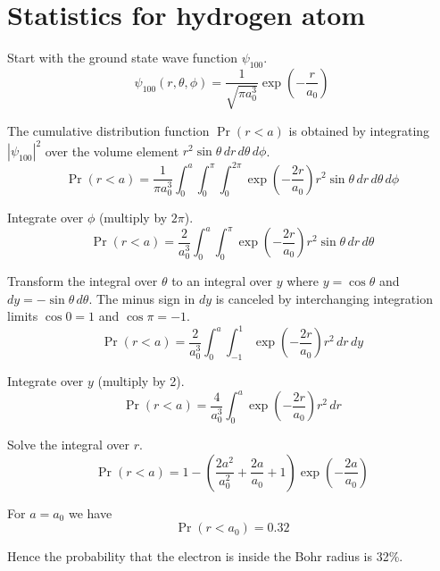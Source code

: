 

\section*{Statistics for hydrogen atom}

Start with the ground state wave function $\psi_{100}$.
\begin{equation*}
\psi_{100}(r,\theta,\phi)=\frac{1}{\sqrt{\pi a_0^3}}\exp\left(-\frac{r}{a_0}\right)
\end{equation*}

The cumulative distribution function $\Pr(r<a)$ is obtained by integrating
$|\psi_{100}|^2$ over the volume element $r^2\sin\theta\,dr\,d\theta\,d\phi$.
\begin{equation*}
\Pr(r<a)=\frac{1}{\pi a_0^3}
\int_0^a\int_0^\pi\int_0^{2\pi}\exp\left(-\frac{2r}{a_0}\right)
r^2\sin\theta\,dr\,d\theta\,d\phi
\end{equation*}

Integrate over $\phi$ (multiply by $2\pi$).
\begin{equation*}
\Pr(r<a)=\frac{2}{a_0^3}
\int_0^a\int_0^\pi\exp\left(-\frac{2r}{a_0}\right)r^2\sin\theta\,dr\,d\theta
\end{equation*}

Transform the integral over $\theta$ to an integral over $y$ where
$y=\cos\theta$ and $dy=-\sin\theta\,d\theta$.
The minus sign in $dy$ is canceled by interchanging integration limits
$\cos0=1$ and $\cos\pi=-1$.
\begin{equation*}
\Pr(r<a)=\frac{2}{a_0^3}
\int_0^a\int_{-1}^1\exp\left(-\frac{2r}{a_0}\right)r^2\,dr\,dy
\end{equation*}

Integrate over $y$ (multiply by 2).
\begin{equation*}
\Pr(r<a)=\frac{4}{a_0^3}
\int_0^a\exp\left(-\frac{2r}{a_0}\right)r^2\,dr
\end{equation*}

Solve the integral over $r$.
\begin{equation*}
\Pr(r<a)=1-\left(\frac{2a^2}{a_0^2}+\frac{2a}{a_0}+1\right)
\exp\left(-\frac{2a}{a_0}\right)
\tag{1}
\end{equation*}

For $a=a_0$ we have
\begin{equation*}
\Pr(r<a_0)=0.32
\end{equation*}

Hence the probability that the electron is inside the Bohr radius is 32\%.

